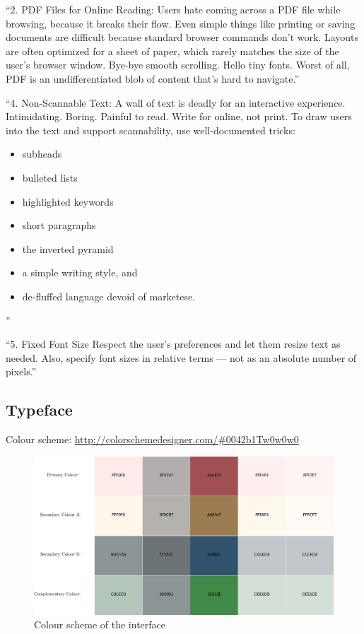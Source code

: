 ``2. PDF Files for Online Reading:
Users hate coming across a PDF file while browsing, because it breaks their flow. Even simple things like printing or saving documents are difficult because standard browser commands don't work. Layouts are often optimized for a sheet of paper, which rarely matches the size of the user's browser window. Bye-bye smooth scrolling. Hello tiny fonts.
Worst of all, PDF is an undifferentiated blob of content that's hard to navigate.''

``4. Non-Scannable Text:
A wall of text is deadly for an interactive experience. Intimidating. Boring. Painful to read.
Write for online, not print. To draw users into the text and support scannability, use well-documented tricks:
\begin{itemize}
	\item subheads
	\item bulleted lists
	\item highlighted keywords
	\item short paragraphs
	\item the inverted pyramid
	\item a simple writing style, and
	\item de-fluffed language devoid of marketese.
\end{itemize}
''

``5. Fixed Font Size
Respect the user's preferences and let them resize text as needed. Also, specify font sizes in relative terms — not as an absolute number of pixels.''
\cite{NielsenOnlineReading}

\subsection{Typeface}

Colour scheme: \url{http://colorschemedesigner.com/#0042b1Tw0w0w0}

\begin{figure}[h!tp]
	\centering
		\includegraphics[width=.45\textwidth]{img/colour-scheme.eps}
	\caption{Colour scheme of the interface \protect\cite{colorschemedesigner.com}}
	\label{fig:colour-scheme}
\end{figure}

